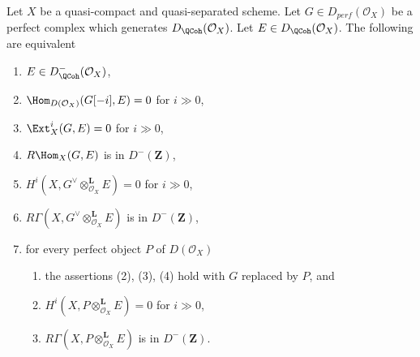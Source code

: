\begin{proposition}
\label{proposition-detecting-bounded-above}
Let $X$ be a quasi-compact and quasi-separated scheme. Let
$G \in D_{perf}(\mathcal{O}_X)$ be a perfect complex which generates 
$D_\QCoh (\mathcal{O}_X)$. Let $E \in D_\QCoh (\mathcal{O}_X)$.
The following are equivalent
\begin{enumerate}
\item $E \in D^-_\QCoh (\mathcal{O}_X)$,
\item $\Hom_{D(\mathcal{O}_X)}(G[-i], E) = 0$ for $i \gg 0$,
\item $\Ext^i_X(G, E) = 0$ for $i \gg 0$,
\item $R\Hom_X(G, E)$ is in $D^-(\mathbf{Z})$,
\item $H^i(X, G^\vee \otimes_{\mathcal{O}_X}^\mathbf{L} E) = 0$
for $i \gg 0$,
\item $R\Gamma(X, G^\vee \otimes_{\mathcal{O}_X}^\mathbf{L} E)$
is in $D^-(\mathbf{Z})$,
\item for every perfect object $P$ of $D(\mathcal{O}_X)$
\begin{enumerate}
\item the assertions (2), (3), (4) hold with $G$ replaced by $P$, and
\item $H^i(X, P \otimes_{\mathcal{O}_X}^\mathbf{L} E) = 0$ for $i \gg 0$,
\item $R\Gamma(X, P \otimes_{\mathcal{O}_X}^\mathbf{L} E)$
is in $D^-(\mathbf{Z})$.
\end{enumerate}
\end{enumerate}
\end{proposition}

